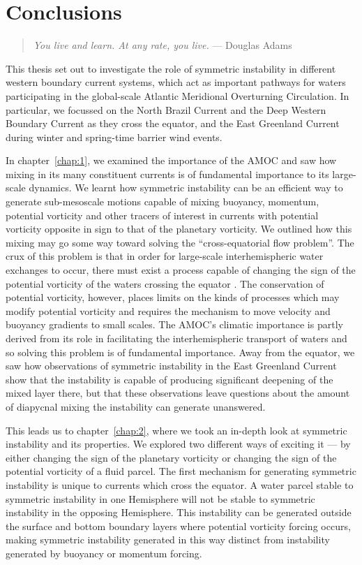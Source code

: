 \chapter{Conclusions}
\begin{quote}
    \textit{You live and learn. At any rate, you live.} --- Douglas Adams
\end{quote}
This thesis set out to investigate the role of symmetric instability in different western boundary current systems, which act as important pathways for waters participating in the global-scale Atlantic Meridional Overturning Circulation. In particular, we focussed on the North Brazil Current and the Deep Western Boundary Current as they cross the equator, and the East Greenland Current during winter and spring-time barrier wind events.

In chapter~\ref{chap:1}, we examined the importance of the AMOC and saw how mixing in its many constituent currents is of fundamental importance to its large-scale dynamics. We learnt how symmetric instability can be an efficient way to generate sub-mesoscale motions capable of mixing buoyancy, momentum, potential vorticity and other tracers of interest in currents with potential vorticity opposite in sign to that of the planetary vorticity. We outlined how this mixing may go some way toward solving the ``cross-equatorial flow problem''. The crux of this problem is that in order for large-scale interhemispheric water exchanges to occur, there must exist a process capable of changing the sign of the potential vorticity of the waters crossing the equator \citet{Killworth1991}. The conservation of potential vorticity, however, places limits on the kinds of processes which may modify potential vorticity and requires the mechanism to move velocity and buoyancy gradients to small scales. The AMOC's climatic importance is partly derived from its role in facilitating the interhemispheric transport of waters and so solving this problem is of fundamental importance. Away from the equator, we saw how observations of symmetric instability in the East Greenland Current show that the instability is capable of producing significant deepening of the mixed layer there, but that these observations leave questions about the amount of diapycnal mixing the instability can generate unanswered.

This leads us to chapter~\ref{chap:2}, where we took an in-depth look at symmetric instability and its properties. We explored two different ways of exciting it --- by either changing the sign of the planetary vorticity or changing the sign of the potential vorticity of a fluid parcel. The first mechanism for generating symmetric instability is unique to currents which cross the equator. A water parcel stable to symmetric instability in one Hemisphere will not be stable to symmetric instability in the opposing Hemisphere. This instability can be generated outside the surface and bottom boundary layers where potential vorticity forcing occurs, making symmetric instability generated in this way distinct from instability generated by buoyancy or momentum forcing.


